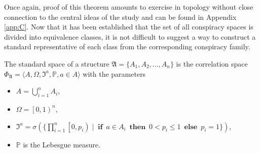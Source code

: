 Once again, proof of this theorem amounts to exercise in topology without close connection to the central ideas of the study and can be found in Appendix \ref{app:C}. Now that it has been established that the set of all conspiracy spaces is divided into equivalence classes, it is not difficult to suggest a way to construct a standard representative of each class from the corresponding conspiracy family. %
\begin{definition}
	The standard space of a structure $\mathfrak{A} = \{A_1, A_2, ..., A_n\}$ is the correlation space $\Phi_{\mathfrak{A}} = \langle A, \Omega, \mathfrak{I}^a, \mathbb{P}, a \in A \rangle$ with the parameters %
	\begin{itemize}
		\item $A = \bigcup\limits_{i=1}^n A_i$,
		\item $\Omega = \left[0, 1\right)^n$,
		\item $\mathfrak{I}^a = \sigma(\{\prod\limits_{i=1}^n\left[ 0, p_i \right) \mid \operatorname{\mathbf{if}} \: a \in A_i \: \operatorname{\mathbf{then}} \: 0 < p_i \leq 1 \: \operatorname{\mathbf{else}} \: p_i = 1 \})$,
		\item $\mathbb{P}$ is the Lebesgue measure. %
	\end{itemize}
\end{definition}

